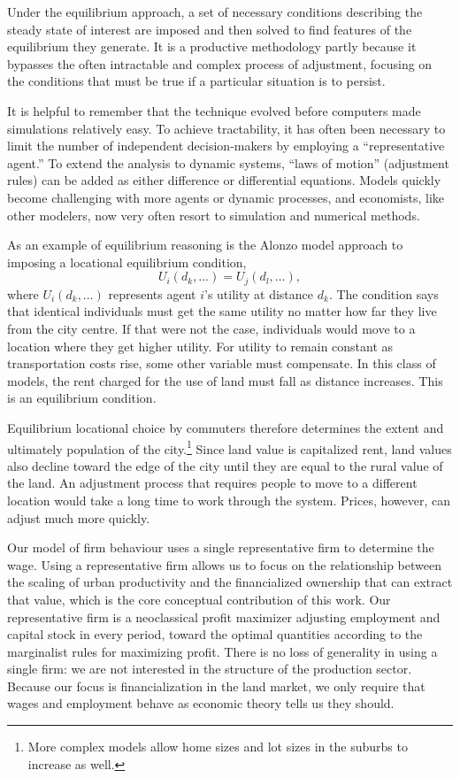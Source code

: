 Under the equilibrium approach, a set of necessary conditions describing the steady state of interest are imposed and then solved to find features of the equilibrium they generate. It is a productive methodology partly because it bypasses the often intractable and complex process of adjustment, focusing on the conditions that must be true if a particular situation is to persist. 

It is helpful to remember that the technique evolved before computers made simulations relatively easy. To achieve tractability, it has often been necessary to limit the number of independent decision-makers by employing a ``representative agent.'' To extend the analysis to dynamic systems, ``laws of motion'' (adjustment rules) can be added as either difference or differential equations.  Models quickly become challenging with more agents or dynamic processes, and economists, like other modelers, now very often resort to simulation and numerical methods. 

As an example of \gls{equilibrium reasoning} is the \Gls{Alonzo model} approach to imposing a locational equilibrium condition,
\[U_i(d_k,\dots)=U_j(d_l, \dots),\]where $U_i(d_k,\dots)$ represents agent $i$'s utility at distance $d_k$. 
The condition says that identical individuals must get the same utility no matter how far they live from the city centre. If that were not the case, individuals would move to a location where they get higher utility. For utility to remain constant as transportation costs rise, some other variable must compensate. In this class of models, the rent charged for the use of land must fall as distance increases.
This is an equilibrium condition. 

Equilibrium locational choice by commuters therefore determines the extent and ultimately population of the city.\footnote{More complex models allow home sizes and lot sizes in the suburbs to increase as well.} Since land value is \gls{capitalize}d rent, land values also decline toward the edge of the city until they are equal to the rural value of the land. 
An adjustment process that requires people to move to a different location would take a long time to work through the system. Prices, however, can adjust much more quickly.

Our model of firm behaviour uses a single representative firm to determine the wage.  Using a representative firm allows us to focus on the relationship between the scaling of urban productivity and the financialized ownership that can extract that value, which is the core conceptual contribution of this work. Our representative firm is a neoclassical profit maximizer adjusting employment and capital stock in every period, toward the optimal quantities according to the marginalist rules for maximizing profit. There is no loss of generality in using a single firm: we are not interested in the structure of the production sector. Because our focus is financialization in the land market, we only require that wages and employment behave as economic theory tells us they should. 

